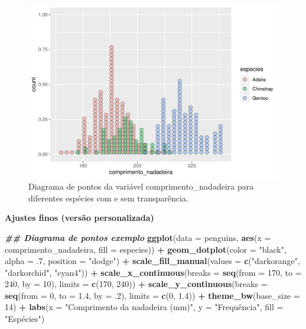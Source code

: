 \documentclass[
]{article}
\newenvironment{Shaded}{\begin{snugshade}}{\end{snugshade}}
\newcommand{\AttributeTok}[1]{\textcolor[rgb]{0.13,0.29,0.53}{#1}}
\newcommand{\DecValTok}[1]{\textcolor[rgb]{0.00,0.00,0.81}{#1}}
\newcommand{\DocumentationTok}[1]{\textcolor[rgb]{0.56,0.35,0.01}{\textbf{\textit{#1}}}}
\newcommand{\FloatTok}[1]{\textcolor[rgb]{0.00,0.00,0.81}{#1}}
\newcommand{\FunctionTok}[1]{\textcolor[rgb]{0.13,0.29,0.53}{\textbf{#1}}}
\newcommand{\NormalTok}[1]{#1}
\newcommand{\SpecialCharTok}[1]{\textcolor[rgb]{0.81,0.36,0.00}{\textbf{#1}}}
\newcommand{\StringTok}[1]{\textcolor[rgb]{0.31,0.60,0.02}{#1}}
\begin{document}
\begin{figure}
\includegraphics[width=0.75\linewidth,height=0.75\textheight]{epr_files/figure-latex/fig-dot-flipper-cat-2} \caption{Diagrama de pontos da variável comprimento_nadadeira para diferentes espécies com e sem transparência.}\label{fig:fig-dot-flipper-cat-2}
\end{figure}

\textbf{Ajustes finos (versão personalizada)}

\begin{Shaded}
\begin{Highlighting}[]
\DocumentationTok{\#\# Diagrama de pontos exemplo}
\FunctionTok{ggplot}\NormalTok{(}\AttributeTok{data =}\NormalTok{ penguins, }
       \FunctionTok{aes}\NormalTok{(}\AttributeTok{x =}\NormalTok{ comprimento\_nadadeira, }\AttributeTok{fill =}\NormalTok{ especies)) }\SpecialCharTok{+}
    \FunctionTok{geom\_dotplot}\NormalTok{(}\AttributeTok{color =} \StringTok{"black"}\NormalTok{, }\AttributeTok{alpha =}\NormalTok{ .}\DecValTok{7}\NormalTok{, }\AttributeTok{position =} \StringTok{"dodge"}\NormalTok{) }\SpecialCharTok{+}
    \FunctionTok{scale\_fill\_manual}\NormalTok{(}\AttributeTok{values =} \FunctionTok{c}\NormalTok{(}\StringTok{"darkorange"}\NormalTok{, }\StringTok{"darkorchid"}\NormalTok{, }\StringTok{"cyan4"}\NormalTok{)) }\SpecialCharTok{+}
    \FunctionTok{scale\_x\_continuous}\NormalTok{(}\AttributeTok{breaks =} \FunctionTok{seq}\NormalTok{(}\AttributeTok{from =} \DecValTok{170}\NormalTok{, }\AttributeTok{to =} \DecValTok{240}\NormalTok{, }\AttributeTok{by =} \DecValTok{10}\NormalTok{), }\AttributeTok{limits =} \FunctionTok{c}\NormalTok{(}\DecValTok{170}\NormalTok{, }\DecValTok{240}\NormalTok{)) }\SpecialCharTok{+}
    \FunctionTok{scale\_y\_continuous}\NormalTok{(}\AttributeTok{breaks =} \FunctionTok{seq}\NormalTok{(}\AttributeTok{from =} \DecValTok{0}\NormalTok{, }\AttributeTok{to =} \FloatTok{1.4}\NormalTok{, }\AttributeTok{by =}\NormalTok{ .}\DecValTok{2}\NormalTok{), }\AttributeTok{limits =} \FunctionTok{c}\NormalTok{(}\DecValTok{0}\NormalTok{, }\FloatTok{1.4}\NormalTok{)) }\SpecialCharTok{+}
    \FunctionTok{theme\_bw}\NormalTok{(}\AttributeTok{base\_size =} \DecValTok{14}\NormalTok{) }\SpecialCharTok{+}
    \FunctionTok{labs}\NormalTok{(}\AttributeTok{x =} \StringTok{"Comprimento da nadadeira (mm)"}\NormalTok{, }\AttributeTok{y =} \StringTok{"Frequência"}\NormalTok{, }\AttributeTok{fill =} \StringTok{"Espécies"}\NormalTok{)}
\end{Highlighting}
\end{Shaded}
\end{document}
